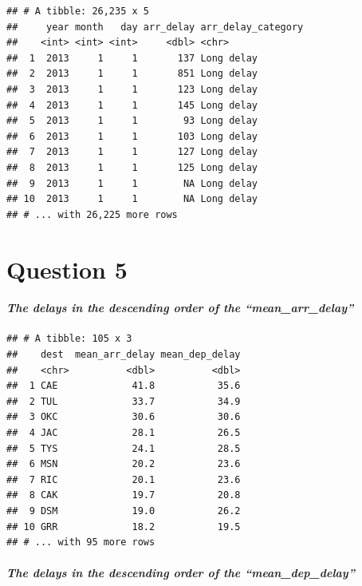 \documentclass[
]{article}
\begin{document}
\begin{verbatim}
## # A tibble: 26,235 x 5
##     year month   day arr_delay arr_delay_category
##    <int> <int> <int>     <dbl> <chr>             
##  1  2013     1     1       137 Long delay        
##  2  2013     1     1       851 Long delay        
##  3  2013     1     1       123 Long delay        
##  4  2013     1     1       145 Long delay        
##  5  2013     1     1        93 Long delay        
##  6  2013     1     1       103 Long delay        
##  7  2013     1     1       127 Long delay        
##  8  2013     1     1       125 Long delay        
##  9  2013     1     1        NA Long delay        
## 10  2013     1     1        NA Long delay        
## # ... with 26,225 more rows
\end{verbatim}

\hypertarget{question-5}{%
\section{Question 5}\label{question-5}}

\hypertarget{the-delays-in-the-descending-order-of-the-mean_arr_delay}{%
\paragraph{\texorpdfstring{\textbf{\emph{The delays in the descending
order of the
``mean\_arr\_delay''}}}{The delays in the descending order of the ``mean\_arr\_delay''}}\label{the-delays-in-the-descending-order-of-the-mean_arr_delay}}

\begin{verbatim}
## # A tibble: 105 x 3
##    dest  mean_arr_delay mean_dep_delay
##    <chr>          <dbl>          <dbl>
##  1 CAE             41.8           35.6
##  2 TUL             33.7           34.9
##  3 OKC             30.6           30.6
##  4 JAC             28.1           26.5
##  5 TYS             24.1           28.5
##  6 MSN             20.2           23.6
##  7 RIC             20.1           23.6
##  8 CAK             19.7           20.8
##  9 DSM             19.0           26.2
## 10 GRR             18.2           19.5
## # ... with 95 more rows
\end{verbatim}

\hypertarget{the-delays-in-the-descending-order-of-the-mean_dep_delay}{%
\paragraph{\texorpdfstring{\textbf{\emph{The delays in the descending
order of the ``mean\_dep\_delay''
}}}{The delays in the descending order of the ``mean\_dep\_delay'' }}\label{the-delays-in-the-descending-order-of-the-mean_dep_delay}}
\end{document}
